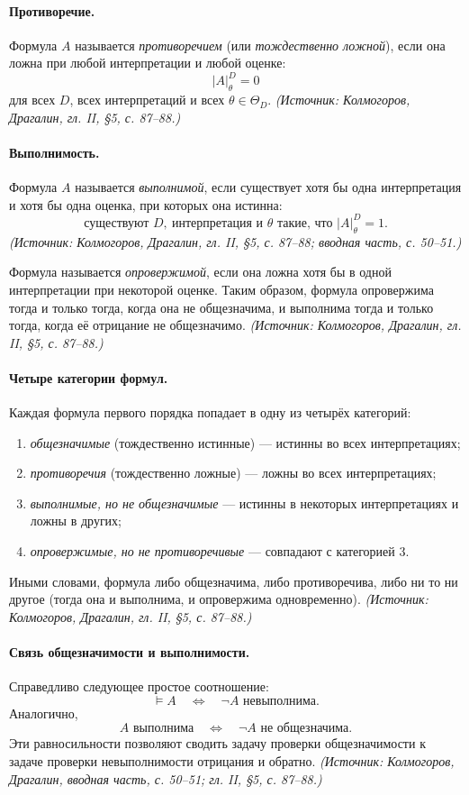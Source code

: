 \documentclass[a4paper,12pt]{article}
\begin{document}
\paragraph{Противоречие.} Формула \(A\) называется \emph{противоречием} (или \emph{тождественно ложной}), если она ложна при любой интерпретации и любой оценке:
\[
|A|^D_\theta=0
\]
для всех \(D\), всех интерпретаций и всех \(\theta\in\Theta_D\).
\textit{(Источник: Колмогоров, Драгалин, гл. II, §5, с. 87--88.)}

\paragraph{Выполнимость.} Формула \(A\) называется \emph{выполнимой}, если существует хотя бы одна интерпретация и хотя бы одна оценка, при которых она истинна:
\[
\text{существуют }D,\ \text{интерпретация и }\theta\text{ такие, что }|A|^D_\theta=1.
\]
\textit{(Источник: Колмогоров, Драгалин, гл. II, §5, с. 87--88; вводная часть, с. 50--51.)}

Формула называется \emph{опровержимой}, если она ложна хотя бы в одной интерпретации при некоторой оценке. Таким образом, формула опровержима тогда и только тогда, когда она не общезначима, и выполнима тогда и только тогда, когда её отрицание не общезначимо.
\textit{(Источник: Колмогоров, Драгалин, гл. II, §5, с. 87--88.)}

\paragraph{Четыре категории формул.} Каждая формула первого порядка попадает в одну из четырёх категорий:
\begin{enumerate}[label=\arabic*)]
\item \emph{общезначимые} (тождественно истинные) --- истинны во всех интерпретациях;
\item \emph{противоречия} (тождественно ложные) --- ложны во всех интерпретациях;
\item \emph{выполнимые, но не общезначимые} --- истинны в некоторых интерпретациях и ложны в других;
\item \emph{опровержимые, но не противоречивые} --- совпадают с категорией 3.
\end{enumerate}
Иными словами, формула либо общезначима, либо противоречива, либо ни то ни другое (тогда она и выполнима, и опровержима одновременно).
\textit{(Источник: Колмогоров, Драгалин, гл. II, §5, с. 87--88.)}

\paragraph{Связь общезначимости и выполнимости.} Справедливо следующее простое соотношение:
\[
\models A \quad\Longleftrightarrow\quad \neg A \text{ невыполнима.}
\]
Аналогично,
\[
A \text{ выполнима} \quad\Longleftrightarrow\quad \neg A \text{ не общезначима.}
\]
Эти равносильности позволяют сводить задачу проверки общезначимости к задаче проверки невыполнимости отрицания и обратно.
\textit{(Источник: Колмогоров, Драгалин, вводная часть, с. 50--51; гл. II, §5, с. 87--88.)}
\end{document}
